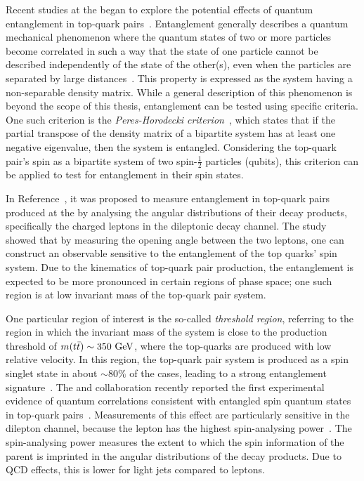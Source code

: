 Recent studies at the \lhc began to explore the potential effects of quantum entanglement in top-quark pairs~\cite{atlas_entanglement}. Entanglement generally describes a quantum mechanical phenomenon where the quantum states of two or more particles become correlated in such a way that the state of one particle cannot be described independently of the state of the other(s), even when the particles are separated by large distances~\cite{schrödinger_entanglement}. This property is expressed as the system having a non-separable density matrix. While a general description of this phenomenon is beyond the scope of this thesis, entanglement can be tested using specific criteria. One such criterion is the \emph{Peres-Horodecki criterion}~\cite{peres_criterion,entanglement_two_qbits}, which states that if the partial transpose of the density matrix of a bipartite system has at least one negative eigenvalue, then the system is entangled. Considering the top-quark pair's spin as a bipartite system of two spin-$\tfrac{1}{2}$ particles (qubits), this criterion can be applied to test for entanglement in their spin states.

In Reference~\cite{entanglement_top_quarks}, it was proposed to measure entanglement in top-quark pairs produced at the \lhc by analysing the angular distributions of their decay products, specifically the charged leptons in the dileptonic decay channel. The study showed that by measuring the opening angle between the two leptons, one can construct an observable sensitive to the entanglement of the top quarks' spin system. Due to the kinematics of top-quark pair production, the entanglement is expected to be more pronounced in certain regions of phase space; one such region is at low invariant mass of the top-quark pair system.

One particular region of interest is the so-called \emph{threshold region}, referring to the region in which the invariant mass of the \ttbar system is close to the production threshold of $m(t\bar{t})\sim 350~\GeV$, where the top-quarks are produced with low relative velocity. In this region, the top-quark pair system is produced as a spin singlet state in about $\sim 80\%$ of the cases, leading to a strong entanglement signature~\cite{toponium_2}. The \atlas and \cms collaboration recently reported the first experimental evidence of quantum correlations consistent with entangled spin quantum states in top-quark pairs~\cite{atlas_entanglement,cms_entanglement}. Measurements of this effect are particularly sensitive in the dilepton channel, because the lepton has the highest spin-analysing power~\cite{spin_analyzing_power,spin_analyzing_power_jets}. The spin-analysing power measures the extent to which the spin information of the parent is imprinted in the angular distributions of the decay products. Due to QCD effects, this is lower for light jets compared to leptons.

